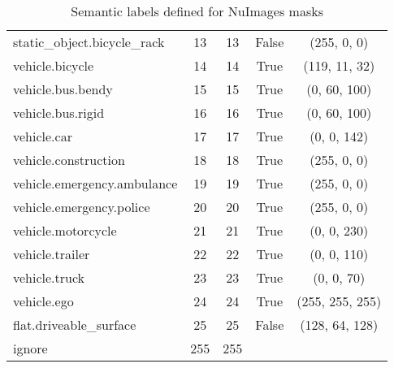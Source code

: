 \begin{table}[h]
\begin{tabular}{l c c c c}
        static\_object.bicycle\_rack        & 13 & 13 & False & (255, 0, 0) \\
        vehicle.bicycle                     & 14 & 14 & True  & (119, 11, 32) \\
        vehicle.bus.bendy                   & 15 & 15 & True  & (0, 60, 100) \\
        vehicle.bus.rigid                   & 16 & 16 & True  & (0, 60, 100) \\
        vehicle.car                         & 17 & 17 & True  & (0, 0, 142) \\
        vehicle.construction                & 18 & 18 & True  & (255, 0, 0) \\
        vehicle.emergency.ambulance         & 19 & 19 & True  & (255, 0, 0) \\
        vehicle.emergency.police            & 20 & 20 & True  & (255, 0, 0) \\
        vehicle.motorcycle                  & 21 & 21 & True  & (0, 0, 230) \\
        vehicle.trailer                     & 22 & 22 & True  & (0, 0, 110) \\
        vehicle.truck                       & 23 & 23 & True  & (0, 0, 70) \\
        vehicle.ego                         & 24 & 24 & True  & (255, 255, 255) \\
        flat.driveable\_surface             & 25 & 25 & False & (128, 64, 128) \\
        \midrule
        ignore                              & 255 & 255 &       &        \\
        \bottomrule
    \end{tabular}
    \caption{Semantic labels defined for NuImages masks}
    \label{tab:semantic_labels}
\end{table}



